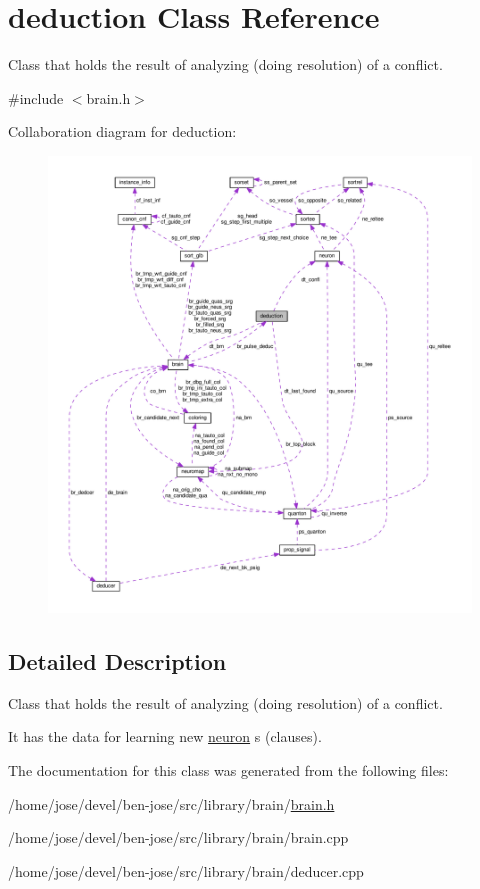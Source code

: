 \hypertarget{classdeduction}{\section{deduction Class Reference}
\label{classdeduction}
}


Class that holds the result of analyzing (doing resolution) of a conflict.  




{\ttfamily \#include $<$brain.\+h$>$}



Collaboration diagram for deduction\+:\nopagebreak
\begin{figure}[H]
\begin{center}
\leavevmode
\includegraphics[width=350pt]{df/d01/classdeduction__coll__graph}
\end{center}
\end{figure}


\subsection{Detailed Description}
Class that holds the result of analyzing (doing resolution) of a conflict. 

It has the data for learning new \hyperlink{classneuron}{neuron} s (clauses). 

The documentation for this class was generated from the following files\+:\begin{DoxyCompactItemize}
\item 
/home/jose/devel/ben-\/jose/src/library/brain/\hyperlink{brain_8h}{brain.\+h}\item 
/home/jose/devel/ben-\/jose/src/library/brain/brain.\+cpp\item 
/home/jose/devel/ben-\/jose/src/library/brain/deducer.\+cpp\end{DoxyCompactItemize}
